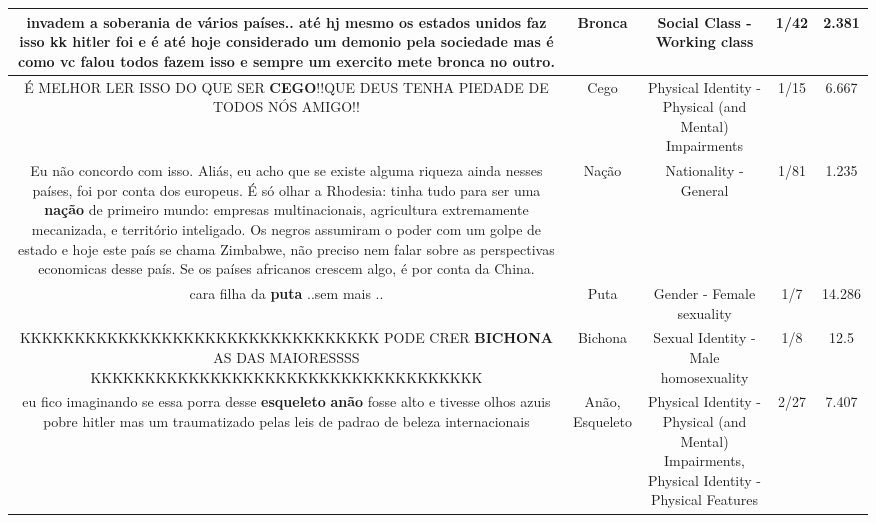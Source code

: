\documentclass[11pt]{article}
\newlength\mylength
\begin{document}
\begin{center}
\begin{longtable}{|C{.65\mylength}|C{.30\mylength}|C{.12\mylength}|C{.12\mylength}|C{.12\mylength}|}
  \small invadem a soberania de vários países.. até hj mesmo os estados unidos faz isso kk hitler foi e é até hoje considerado um demonio pela sociedade mas é como vc falou todos fazem isso e sempre um exercito mete \textbf{bronca} no outro.\normalsize   & Bronca & Social Class - Working class & 1/42 & 2.381 \\  \hline
  \small É MELHOR LER ISSO DO QUE SER \textbf{CEGO}!!QUE DEUS TENHA PIEDADE DE TODOS NÓS AMIGO!!\normalsize   & Cego & Physical Identity - Physical (and Mental) Impairments & 1/15 & 6.667 \\  \hline
  \small Eu não concordo com isso. Aliás, eu acho que se existe alguma riqueza ainda nesses países, foi por conta dos europeus. É só olhar a Rhodesia: tinha tudo para ser uma \textbf{nação} de primeiro mundo: empresas multinacionais, agricultura extremamente mecanizada, e território inteligado. Os negros assumiram o poder com um golpe de estado e hoje este país se chama Zimbabwe, não preciso nem falar sobre as perspectivas economicas desse país. Se os países africanos crescem algo, é por conta da China.\normalsize   & Nação & Nationality - General & 1/81 & 1.235 \\  \hline
  \small cara filha da \textbf{puta} ..sem mais ..\normalsize   & Puta & Gender - Female sexuality & 1/7 & 14.286 \\  \hline
  \small KKKKKKKKKKKKKKKKKKKKKKKKKKKKKKKKK PODE CRER \textbf{BICHONA} AS DAS MAIORESSSS  KKKKKKKKKKKKKKKKKKKKKKKKKKKKKKKKKKKK\normalsize   & Bichona & Sexual Identity - Male homosexuality & 1/8 & 12.5 \\  \hline
  \small eu fico imaginando se essa  porra desse \textbf{esqueleto} \textbf{anão}  fosse alto e tivesse olhos azuis pobre hitler  mas um traumatizado  pelas leis de padrao de beleza internacionais\normalsize   & Anão, Esqueleto & Physical Identity - Physical (and Mental) Impairments, Physical Identity - Physical Features & 2/27 & 7.407 \\  \hline

\end{longtable}
\end{center}
\end{document}
